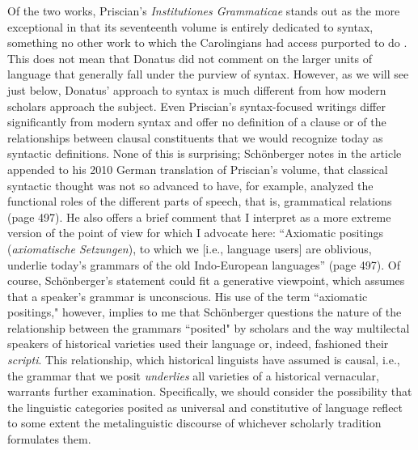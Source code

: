 Of the two works, Priscian’s \textit{Institutiones Grammaticae} stands out as the more exceptional in that its seventeenth volume is entirely dedicated to syntax, something no other work to which the Carolingians had access purported to do \citep[146]{Luhtala1993}. This does not mean that Donatus did not comment on the larger units of language that generally fall under the purview of syntax. However, as we will see just below, Donatus’ approach to syntax is much different from how modern scholars approach the subject. Even Priscian’s syntax-focused writings differ significantly from modern syntax and offer no definition of a clause or of the relationships between clausal constituents that we would recognize today as syntactic definitions. None of this is surprising; Schönberger notes in the article appended to his 2010 German translation of Priscian’s volume, that classical syntactic thought was not so advanced to have, for example, analyzed the functional roles of the different parts of speech, that is, grammatical relations (page 497). He also offers a brief comment that I interpret as a more extreme version of the point of view for which I advocate here: “Axiomatic positings (\textit{axiomatische Setzungen}), to which we [i.e., language users] are oblivious, underlie today’s grammars of the old Indo-European languages” (page 497). Of course, Schönberger’s statement could fit a generative viewpoint, which assumes that a speaker's grammar is unconscious. His use of the term “axiomatic positings," however, implies to me that Schönberger questions the nature of the relationship between the grammars “posited" by scholars and the way multilectal speakers of historical varieties used their language or, indeed, fashioned their \textit{scripti}. This relationship, which historical linguists have assumed is causal, i.e., the grammar that we posit \textit{underlies} all varieties of a historical vernacular, warrants further examination. Specifically, we should consider the possibility that the linguistic categories posited as universal and constitutive of language reflect to some extent the metalinguistic discourse of whichever scholarly tradition formulates them. 

